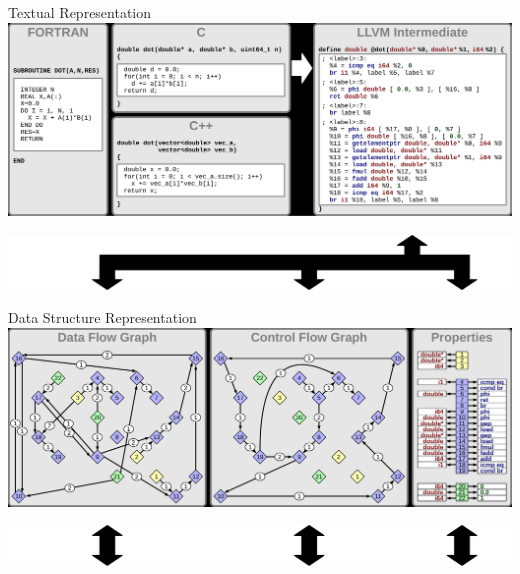 \centering
\begin{blackbox}{Textual Representation}
\includegraphics[width=\columnwidth]{figures/model_representations_textual}
\end{blackbox}

\includegraphics[width=\columnwidth]{figures/model_arrows_upper}

\begin{blackbox}{Data Structure Representation}
\includegraphics[width=\columnwidth]{figures/model_representations_structure}
\end{blackbox}

\includegraphics[width=\columnwidth]{figures/model_arrows_lower}

